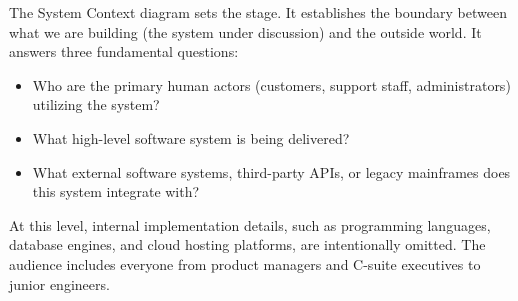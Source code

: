 The System Context diagram sets the stage. It establishes the boundary between what we are building (the system under discussion) and the outside world. It answers three fundamental questions:
\begin{itemize}[leftmargin=14pt]
  \item Who are the primary human actors (customers, support staff, administrators) utilizing the system?
  \item What high-level software system is being delivered?
  \item What external software systems, third-party APIs, or legacy mainframes does this system integrate with?
\end{itemize}

At this level, internal implementation details, such as programming languages, database engines, and cloud hosting platforms, are intentionally omitted. The audience includes everyone from product managers and C-suite executives to junior engineers.


